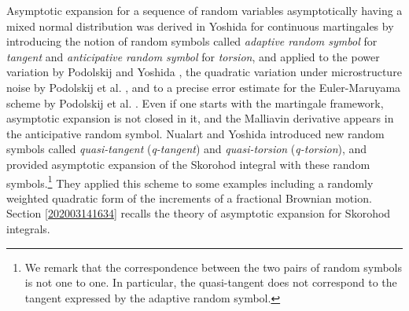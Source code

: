 \documentclass[a4paper,12pt]{article}
\numberwithin{equation}{section}
\numberwithin{equation}{section}
\begin{document}
Asymptotic expansion for a sequence of random variables asymptotically having 
a mixed normal distribution was derived in Yoshida \cite{yoshida2013martingale} 
for continuous martingales 
by introducing the notion of random symbols 
called {\it adaptive random symbol} for {\it tangent} 
and {\it anticipative random symbol} for {\it torsion}, and applied to 
the power variation by Podolskij and Yoshida \cite{podolskij2016edgeworth}, 
the quadratic variation under microstructure noise by 
Podolskij et al. \cite{podolskij2017edgeworth}, and to 
a precise error estimate for the Euler-Maruyama scheme 
by Podolskij et al. \cite{podolskij2018edgeworthToappear}. %
Even if one starts with the martingale framework, asymptotic expansion is not closed in it, 
and the Malliavin derivative appears in the anticipative random symbol. 
Nualart and Yoshida \cite{nualart2019asymptotic} introduced 
new random symbols called {\it quasi-tangent} ({\it q-tangent}) and {\it quasi-torsion} ({\it q-torsion}), 
and provided 
asymptotic expansion of the Skorohod integral with these random symbols.\footnote{We remark that the correspondence between the two pairs of random symbols 
is not one to one. In particular, the quasi-tangent does not correspond to the tangent 
expressed by the adaptive random symbol. }
They applied this scheme to some examples including a randomly weighted 
quadratic form of the increments of a fractional Brownian motion. 
Section \ref{202003141634} recalls the theory of asymptotic expansion for Skorohod integrals. 
\end{document}
